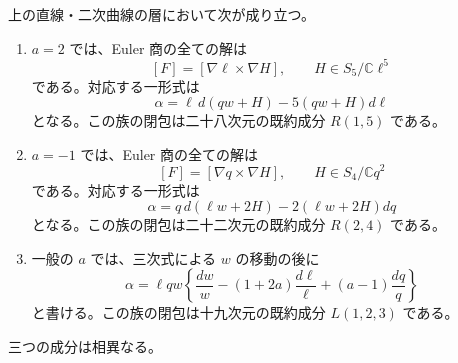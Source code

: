 \begin{proposition}[二つの有理型成分の標準形]
\label{prop:lineconic-rational-v32}
上の直線・二次曲線の層において次が成り立つ。
\begin{enumerate}
\item $a=2$ では、Euler 商の全ての解は
\[
 [F]=[\nabla\ell\times\nabla H],\qquad H\in S_5/\mathbb C\ell^5
\]
である。対応する一形式は
\[
 \alpha=\ell\,d(qw+H)-5(qw+H)d\ell
\]
となる。この族の閉包は二十八次元の既約成分 $R(1,5)$ である。
\item $a=-1$ では、Euler 商の全ての解は
\[
 [F]=[\nabla q\times\nabla H],\qquad H\in S_4/\mathbb Cq^2
\]
である。対応する一形式は
\[
 \alpha=q\,d(\ell w+2H)-2(\ell w+2H)dq
\]
となる。この族の閉包は二十二次元の既約成分 $R(2,4)$ である。
\item 一般の $a$ では、三次式による $w$ の移動の後に
\[
 \alpha=\ell qw\left\{\frac{dw}{w}-(1+2a)\frac{d\ell}{\ell}
                          +(a-1)\frac{dq}{q}\right\}
\]
と書ける。この族の閉包は十九次元の既約成分 $L(1,2,3)$ である。
\end{enumerate}
三つの成分は相異なる。
\end{proposition}

